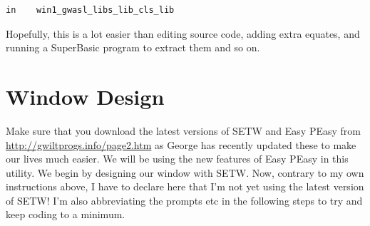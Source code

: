 \begin{lstlisting}[firstnumber=1,]
              in    win1_gwasl_libs_lib_cls_lib
\end{lstlisting}

Hopefully, this is a lot easier than editing source code, adding
    extra equates, and running a SuperBasic program to extract them and so
    on.

\section{Window Design}
\label{ch31-lib-gen-window-design}%

Make sure that you download the latest versions of
 SETW and Easy PEasy     from \url{http://gwiltprogs.info/page2.htm} as George has recently updated these to make our lives much easier. We
    will be using the new features of Easy PEasy in
    this utility. We begin by designing our window with
 SETW. Now, contrary to my own instructions
    above, I have to declare here that I'm not yet using the latest version of
 SETW! I'm also abbreviating the prompts etc in
    the following steps to try and keep coding to a minimum.
